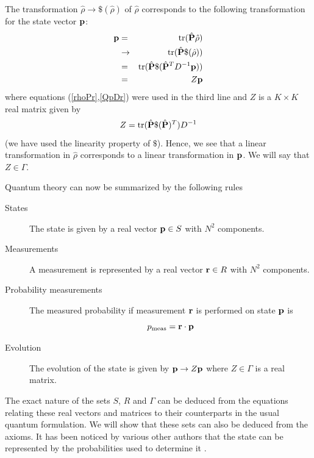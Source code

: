 \documentclass[12pt]{article}
\begin{document}
The transformation $\hat{\rho}\rightarrow \$ (\hat{\rho})$
of $\hat{\rho}$ corresponds to the following transformation for
the state vector ${\bf p}$:
\begin{eqnarray*}
{\bf p}
& = & {\rm tr}(\hat{\bf P}\hat{\rho})            \\
&\rightarrow & {\rm tr} (\hat{\bf P} \$(\hat{\rho})) \\
& = & {\rm tr} (\hat{\bf P} \$(\hat{\bf P}^T D^{-1} {\bf p})) \\
& = & Z {\bf p}
\end{eqnarray*}
where equations (\ref{rhoPr},\ref{QpDr}) were used in the third line and
$Z$ is a $K\times K$ real matrix given by
\begin{equation}\label{transprho}
Z={\rm tr}(\hat{\bf P}\$(\hat{\bf P})^T) D^{-1}
\end{equation}
(we have used the linearity property of $\$ $). Hence, we see that a linear
transformation in $\hat{\rho}$ corresponds to a linear transformation in ${\bf
p}$. We will say that $Z\in\Gamma$.

Quantum theory can now be summarized by the following rules
\begin{description}
\item[States] The state is given by a real vector ${\bf p}\in S$ with
$N^2$ components.
\item[Measurements] A measurement is represented by a real vector ${\bf
r}\in R$ with $N^2$ components.
\item[Probability measurements] The measured probability if measurement
${\bf r}$ is performed on state ${\bf p}$ is
\[ p_{\rm meas}= {\bf r}\cdot {\bf p}  \]
\item[Evolution] The evolution of the state is given by ${\bf
p}\rightarrow Z {\bf p}$ where $Z\in\Gamma$ is a real matrix.
\end{description}
The exact nature of the sets $S$, $R$ and $\Gamma$ can be deduced from
the equations relating these real vectors and matrices to their
counterparts in the usual quantum formulation.  We will show that these
sets can also be deduced from the
axioms. It has been noticed by various other authors that the state can
be represented by the probabilities used to determine it
\cite{wootters,stefan}.
\end{document}
